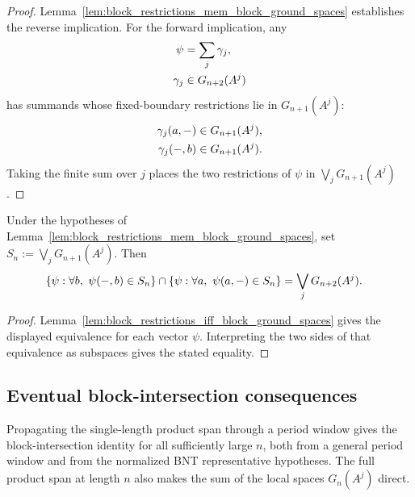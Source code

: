 \begin{proof}
    \leanok
    Lemma~\ref{lem:block_restrictions_mem_block_ground_spaces} establishes the
    reverse implication. For the forward implication, any
    \begin{align}
        \psi     & =\sum_j\gamma_j,
        \notag                      \\
        \gamma_j & \in G_{n+2}(A^j)
        \notag
    \end{align}
    has summands whose fixed-boundary restrictions lie in $G_{n+1}(A^j)$:
    \begin{align}
        \gamma_j(a,-) & \in G_{n+1}(A^j),
        \notag                            \\
        \gamma_j(-,b) & \in G_{n+1}(A^j).
        \notag
    \end{align}
    Taking the finite sum over $j$ places the two restrictions of $\psi$ in
    $\bigvee_jG_{n+1}(A^j)$.
\end{proof}

\begin{lemma}
    \label{lem:block_restriction_intersection_subspace}
    \leanok
    Under the hypotheses of
    Lemma~\ref{lem:block_restrictions_mem_block_ground_spaces}, set
    $S_n:=\bigvee_jG_{n+1}(A^j)$. Then
    \begin{align}
        \left\{\psi:\forall b,\ \psi(-,b)\in S_n\right\}
        \cap
        \left\{\psi:\forall a,\ \psi(a,-)\in S_n\right\}
         & =
        \bigvee_jG_{n+2}(A^j). \notag
    \end{align}
\end{lemma}

\begin{proof}
    \leanok
    Lemma~\ref{lem:block_restrictions_iff_block_ground_spaces} gives the
    displayed equivalence for each vector $\psi$. Interpreting the two sides
    of that equivalence as subspaces gives the stated equality.
\end{proof}

\subsection{Eventual block-intersection consequences}
\label{subsec:block_intersection_eventual}

Propagating the single-length product span through a period window gives the
block-intersection identity for all sufficiently large $n$, both from a general
period window and from the normalized BNT representative hypotheses. The full
product span at length $n$ also makes the sum of the local spaces $G_n(A^j)$
direct.

